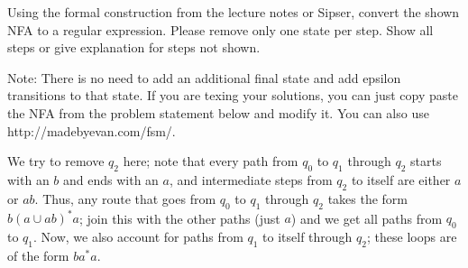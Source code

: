 \documentclass[solution, letterpaper]{cs121}
\begin{document}
\pagebreak
{}
Using the formal construction from the lecture notes or Sipser, convert the shown NFA to a regular expression. Please remove only one state per step. Show all steps or give explanation for steps not shown. 
	
Note: There is no need to add an additional final state and add epsilon transitions to that state. If you are texing your solutions, you can just copy paste the NFA from the problem statement below and modify it. You can also use http://madebyevan.com/fsm/.
	
\bigskip

	
\pagebreak



\vspace{0.5cm}

\noindent We try to remove $q_2$ here; note that every path from $q_0$ to $q_1$ through $q_2$ starts with an $b$ and ends with an $a$, and intermediate steps from $q_2$ to itself are either $a$ or $ab$.  Thus, any route that goes from $q_0$ to $q_1$ through $q_2$ takes the form $b(a \cup ab)^*a$; join this with the other paths (just $a$) and we get all paths from $q_0$ to $q_1$.  Now, we also account for paths from $q_1$ to itself through $q_2$; these loops are of the form $ba^*a$.
\end{document}
